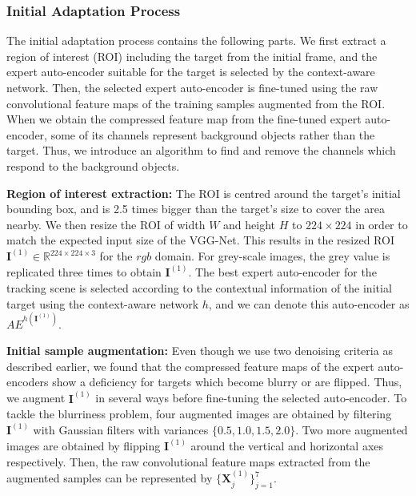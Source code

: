 \documentclass[10pt,twocolumn,letterpaper]{article}
\begin{document}
\subsubsection{Initial Adaptation Process} \label{sec:initialAdap}
\hspace{3mm}The initial adaptation process contains the following parts. We first extract a region of interest (ROI) including the target from the initial frame, and the expert auto-encoder suitable for the target is selected by the context-aware network.
Then, the selected expert auto-encoder is fine-tuned using the raw convolutional feature maps of the training samples augmented from the ROI.
When we obtain the compressed feature map from the fine-tuned expert auto-encoder, some of its channels represent background objects rather than the target.
Thus, we introduce an algorithm to find and remove the channels which respond to the background objects.

\textbf{Region of interest extraction: }
The ROI is centred around the target's initial bounding box, and is 2.5 times bigger than the target's size to cover the area nearby. 
We then resize the ROI of width $W$ and height $H$ to $224\times 224$ in order to match the expected input size of the VGG-Net.
This results in the resized ROI $\mathbf{I}^{(1)}\in\mathbb{R}^{224\times 224\times 3}$ for the $rgb$ domain. 
For grey-scale images, the grey value is replicated three times to obtain $\mathbf{I}^{(1)}$.
The best expert auto-encoder for the tracking scene is selected according to the contextual information of the initial target using the context-aware network $h$, and we can denote this auto-encoder as $AE^{h(\mathbf{I}^{(1)})}$.


\textbf{Initial sample augmentation: }
Even though we use two denoising criteria as described earlier, we found that the compressed feature maps of the expert auto-encoders show a deficiency for targets which become blurry or are flipped. 
Thus, we augment $\mathbf{I}^{(1)}$ in several ways before fine-tuning the selected auto-encoder. 
To tackle the blurriness problem, four augmented images are obtained by filtering $\mathbf{I}^{(1)}$ with Gaussian filters with variances $\{0.5, 1.0, 1.5, 2.0\}$. Two more augmented images are obtained by flipping $\mathbf{I}^{(1)}$ around the vertical and horizontal axes respectively.
Then, the raw convolutional feature maps extracted from the augmented samples can be represented by $\{\mathbf{X}^{(1)}_j\}_{j=1}^7$.
\end{document}
